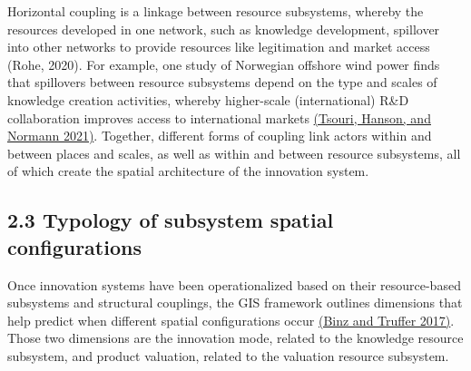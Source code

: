 \documentclass[twoside,12pt,final]{ucthesis-CA2012}
\begin{document}
\begin{ucmainmatter}
Horizontal coupling is a linkage between resource subsystems, whereby
the resources developed in one network, such as knowledge development,
spillover into other networks to provide resources like legitimation and
market access (Rohe, 2020). For example, one study of Norwegian offshore
wind power finds that spillovers between resource subsystems depend on
the type and scales of knowledge creation activities, whereby
higher-scale (international) R\&D collaboration improves access to
international markets \href{https://www.zotero.org/google-docs/?KCyEhr}{(Tsouri, Hanson, and Normann
2021)}. Together, different
forms of coupling link actors within and between places and scales, as
well as within and between resource subsystems, all of which create the
spatial architecture of the innovation system.

\hypertarget{typology-of-subsystem-spatial-configurations}{%
\subsection{2.3 Typology of subsystem spatial configurations}\label{typology-of-subsystem-spatial-configurations}}

Once innovation systems have been operationalized based on their
resource-based subsystems and structural couplings, the GIS framework
outlines dimensions that help predict when different spatial
configurations occur \href{https://www.zotero.org/google-docs/?X0ymK2}{(Binz and Truffer
2017)}. Those two dimensions
are the innovation mode, related to the knowledge resource subsystem,
and product valuation, related to the valuation resource subsystem.


\end{ucmainmatter}
\end{document}
